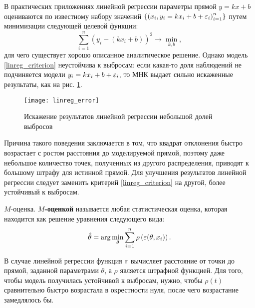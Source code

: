 
В практических приложениях линейной регрессии параметры прямой $y=kx+b$ оцениваются по известному набору значений $\left\{ \left( x_i, y_i = k x_i + b + \varepsilon_i \right)_{i=1}^{n}\right\}$ путем минимизации следующей целевой функции:
\begin{equation}
\label{linreg_criterion}
    \sum_{i=1}^{n} \left( y_i - \left( kx_i+b \right) \right)^2 \to \min_{k, b},
\end{equation}
для чего существует хорошо описанное аналитическое решение.
Однако модель \eqref{linreg_criterion} неустойчива к выбросам: если какая-то доля наблюдений не подчиняется модели $y_i = k x_i + b + \varepsilon_i$, то МНК выдает сильно искаженные результаты, как на рис. \ref{img:linreg_errors}.

\begin{figure}[!h]
    \centering
    \texttt{[image: linreg\_error]}
    \caption{Искажение результатов линейной регрессии небольшой долей выбросов}
    \label{img:linreg_errors}
\end{figure}

Причина такого поведения заключается в том, что квадрат отклонения быстро возрастает с ростом расстояния до моделируемой прямой, поэтому даже небольшое количество точек, полученных из другого распределения, приводят к большому штрафу для истинной прямой. Для улучшения результатов линейной регрессии следует заменить критерий \eqref{linreg_criterion} на другой, более устойчивый к выбросам.

\begin{definition}{$M$-оценка.}
    \textbf{$M$-оценкой} называется любая статистическая оценка, которая находится как решение уравнения следующего вида:
    \begin{equation}
    \label{m_est}
        \hat{\theta} = \arg\min_{\theta} \sum_{i=1}^{n} \rho\left( \varepsilon(\theta, x_i) \right).
    \end{equation}
\end{definition}

В случае линейной регрессии функция $\varepsilon$ вычисляет расстояние от точки до прямой, заданной параметрами $\theta$, а $\rho$ является штрафной функцией. Для того, чтобы модель получилась устойчивой к выбросам, нужно, чтобы $\rho\left( t \right)$ сравнительно быстро возрастала в окрестности нуля, после чего возрастание замедлялось бы.

